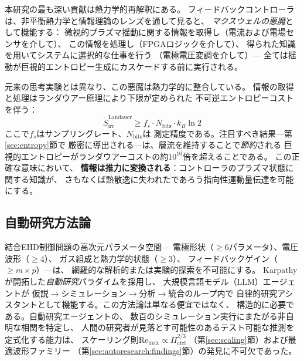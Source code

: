 \documentclass[12pt,twocolumn]{ltjsarticle}
\newcommand{\Sdot}{\dot{S}_{\mathrm{irr}}}
\newcommand{\Pctrl}{\Pi_{\mathrm{ctrl}}}
\begin{document}
本研究の最も深い貢献は熱力学的再解釈にある。
フィードバックコントローラは、非平衡熱力学と情報理論のレンズを通して見ると、
\emph{マクスウェルの悪魔}\cite{Maxwell1871, Leff2002}として機能する：
微視的プラズマ揺動に関する情報を取得し（電流および電場センサを介して）、
この情報を処理し（FPGAロジックを介して）、
得られた知識を用いてシステムに選択的な仕事を行う
（電極電圧変調を介して）---
全ては揺動が巨視的エントロピー生成にカスケードする前に実行される。

元来の思考実験とは異なり、この悪魔は熱力学的に整合している。
情報の取得と処理はランダウアー原理により下限が定められた
不可逆エントロピーコストを伴う\cite{Landauer1961, Bennett2003}：
\begin{equation}
  \Sdot^{\mathrm{Landauer}}
  \geq f_s \cdot N_{\mathrm{bits}} \cdot k_B \ln 2
  \label{eq:intro:landauer}
\end{equation}
ここで$f_s$はサンプリングレート、$N_{\mathrm{bits}}$は
測定精度である。注目すべき結果---第\ref{sec:entropy}節で
厳密に導出される---は、層流を維持することで\emph{節約}される
巨視的エントロピーがランダウアーコストの約$10^{10}$倍を超えることである。
この正確な意味において、
\textbf{情報は推力に変換される}：コントローラのプラズマ状態に関する知識が、
さもなくば熱散逸に失われたであろう指向性運動量伝達を可能にする。

\subsection{自動研究方法論}
\label{sec:intro:autoresearch}

結合EHD制御問題の高次元パラメータ空間---
電極形状（$\geq 6$パラメータ）、電圧波形（$\geq 4$）、
ガス組成と熱力学的状態（$\geq 3$）、
フィードバックゲイン（$\geq m \times p$）---は、
網羅的な解析的または実験的探索を不可能にする。
Karpathy\cite{Karpathy2025}が開拓した\emph{自動研究}パラダイムを採用し、
大規模言語モデル（LLM）エージェントが
仮説$\to$シミュレーション$\to$分析$\to$統合のループ内で
自律的研究アシスタントとして機能する。この方法論は単なる便宜ではなく、
構造的に必要である。自動研究エージェントの、
数百のシミュレーション実行にまたがる非自明な相関を特定し、
人間の研究者が見落とす可能性のあるテスト可能な推測を定式化する能力は、
スケーリング則$\mathrm{Re}_{\max} \propto \Pctrl^{2/3}$
（第\ref{sec:scaling}節）および最適波形ファミリー
（第\ref{sec:autoresearch:findings}節）の発見に不可欠であった。

\end{document}
